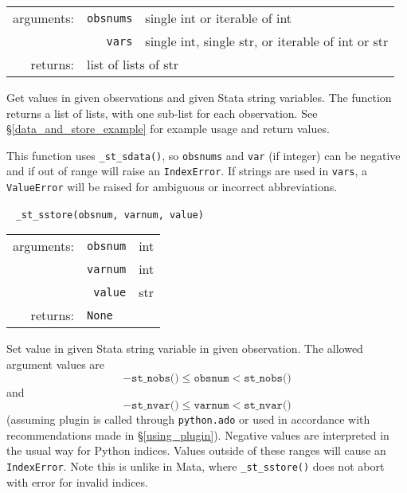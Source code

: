 \documentclass{article}
\begin{document}
			\vspace{1.5mm}
			\noindent 
			\indent \begin{tabular}{rrl}
					arguments: & \texttt{obsnums} & single int or iterable of int \\
						& \texttt{vars} & single int, single str, or iterable of int or str \\
					returns: & \multicolumn{2}{l}{list of lists of str}
				\end{tabular}
								
			\vspace{1.5mm}
			\noindent Get values in given observations and given Stata string variables. The function returns a list of lists, with one sub-list for each observation. See \S\ref{data_and_store_example} for example usage and return values. 
			
			This function uses \lstinline{_st_sdata()}, so \lstinline{obsnums} and \lstinline{var} (if integer) can be negative and if out of range will raise an \lstinline{IndexError}. If strings are used in \lstinline{vars}, a \lstinline{ValueError} will be raised for ambiguous or incorrect abbreviations. \newline
			
			
			\ \newline
			\noindent \lstinline$_st_sstore(obsnum, varnum, value)$
								
			\vspace{1.5mm}
			\noindent 
			\indent \begin{tabular}{rrl}
					arguments: & \texttt{obsnum} & int \\
					  & \texttt{varnum} & int \\						
						& \texttt{value} & str \\
					returns: & \multicolumn{2}{l}{\texttt{None}}
				\end{tabular}
								
			\vspace{1.5mm}
			\noindent Set value in given Stata string variable in given observation. The allowed argument values are 
			\[
				-\texttt{st\_nobs()} \leq \texttt{obsnum} < \texttt{st\_nobs()}
			\]
			and
			\[
				-\texttt{st\_nvar()} \leq \texttt{varnum} < \texttt{st\_nvar()}
			\]
			(assuming plugin is called through \lstinline$python.ado$ or used in accordance with recommendations made in \S\ref{using_plugin}). Negative values are interpreted in the usual way for Python indices. Values outside of these ranges will cause an \lstinline$IndexError$. Note this is unlike in Mata, where \lstinline{_st_sstore()} does not abort with error for invalid indices. \newline
			
\end{document}
